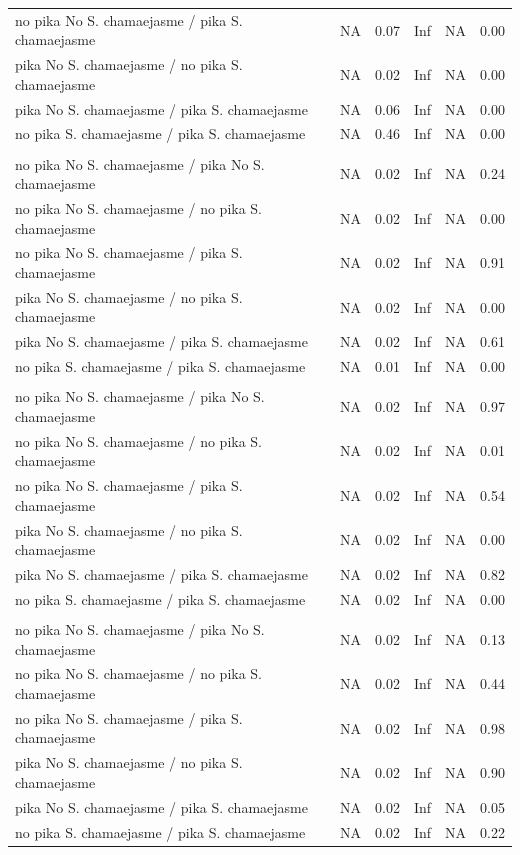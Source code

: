 \documentclass[
  letterpaper,
  DIV=11,
  numbers=noendperiod]{scrartcl}
\begin{document}
\begin{supptbl}
{\begin{table}
\begin{tabular*}{\linewidth}{@{\extracolsep{\fill}}lrrrrr}
no pika No S. chamaejasme / pika S. chamaejasme & NA & 0.07 & Inf & NA & 0.00 \\ 
pika No S. chamaejasme / no pika S. chamaejasme & NA & 0.02 & Inf & NA & 0.00 \\ 
pika No S. chamaejasme / pika S. chamaejasme & NA & 0.06 & Inf & NA & 0.00 \\ 
no pika S. chamaejasme / pika S. chamaejasme & NA & 0.46 & Inf & NA & 0.00 \\ 
\midrule\addlinespace[2.5pt]
\multicolumn{6}{l}{crude protein \%} \\[2.5pt] 
\midrule\addlinespace[2.5pt]
no pika No S. chamaejasme / pika No S. chamaejasme & NA & 0.02 & Inf & NA & 0.24 \\ 
no pika No S. chamaejasme / no pika S. chamaejasme & NA & 0.02 & Inf & NA & 0.00 \\ 
no pika No S. chamaejasme / pika S. chamaejasme & NA & 0.02 & Inf & NA & 0.91 \\ 
pika No S. chamaejasme / no pika S. chamaejasme & NA & 0.02 & Inf & NA & 0.00 \\ 
pika No S. chamaejasme / pika S. chamaejasme & NA & 0.02 & Inf & NA & 0.61 \\ 
no pika S. chamaejasme / pika S. chamaejasme & NA & 0.01 & Inf & NA & 0.00 \\ 
\midrule\addlinespace[2.5pt]
\multicolumn{6}{l}{acid detergent fibre \%} \\[2.5pt] 
\midrule\addlinespace[2.5pt]
no pika No S. chamaejasme / pika No S. chamaejasme & NA & 0.02 & Inf & NA & 0.97 \\ 
no pika No S. chamaejasme / no pika S. chamaejasme & NA & 0.02 & Inf & NA & 0.01 \\ 
no pika No S. chamaejasme / pika S. chamaejasme & NA & 0.02 & Inf & NA & 0.54 \\ 
pika No S. chamaejasme / no pika S. chamaejasme & NA & 0.02 & Inf & NA & 0.00 \\ 
pika No S. chamaejasme / pika S. chamaejasme & NA & 0.02 & Inf & NA & 0.82 \\ 
no pika S. chamaejasme / pika S. chamaejasme & NA & 0.02 & Inf & NA & 0.00 \\ 
\midrule\addlinespace[2.5pt]
\multicolumn{6}{l}{ether extract \%} \\[2.5pt] 
\midrule\addlinespace[2.5pt]
no pika No S. chamaejasme / pika No S. chamaejasme & NA & 0.02 & Inf & NA & 0.13 \\ 
no pika No S. chamaejasme / no pika S. chamaejasme & NA & 0.02 & Inf & NA & 0.44 \\ 
no pika No S. chamaejasme / pika S. chamaejasme & NA & 0.02 & Inf & NA & 0.98 \\ 
pika No S. chamaejasme / no pika S. chamaejasme & NA & 0.02 & Inf & NA & 0.90 \\ 
pika No S. chamaejasme / pika S. chamaejasme & NA & 0.02 & Inf & NA & 0.05 \\ 
no pika S. chamaejasme / pika S. chamaejasme & NA & 0.02 & Inf & NA & 0.22 \\ 
\bottomrule
\end{tabular*}
\end{table}

}
\end{supptbl}
\end{document}
